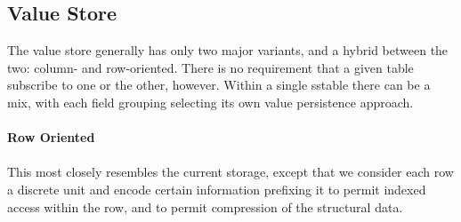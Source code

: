 \documentclass[fleqn]{article}
\begin{document}
\subsection{Value Store}
The value store generally has only two major variants, and a hybrid between the two: column- and row-oriented.
There is no requirement that a given table subscribe to one or the other, however. Within a single sstable
there can be a mix, with each field grouping selecting its own value persistence approach.
\paragraph{Row Oriented}
\paragraph{}
This most closely resembles the current storage, except that we consider each row a discrete unit
and encode certain information prefixing it to permit indexed access within the row, and to permit
compression of the structural data.
\end{document}
